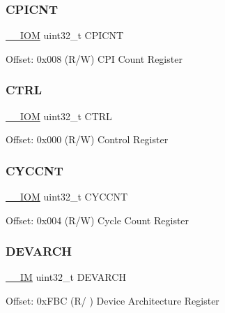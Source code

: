 \subsubsection{\texorpdfstring{C\+P\+I\+C\+NT}{CPICNT}}
{\footnotesize\ttfamily \mbox{\hyperlink{core__cm4_8h_ab6caba5853a60a17e8e04499b52bf691}{\+\_\+\+\_\+\+I\+OM}} uint32\+\_\+t C\+P\+I\+C\+NT}

Offset\+: 0x008 (R/W) C\+PI Count Register \mbox{\label{struct_d_w_t___type_ac81efc171e9852a36caeb47122bfec5b}} 
\subsubsection{\texorpdfstring{C\+T\+RL}{CTRL}}
{\footnotesize\ttfamily \mbox{\hyperlink{core__cm4_8h_ab6caba5853a60a17e8e04499b52bf691}{\+\_\+\+\_\+\+I\+OM}} uint32\+\_\+t C\+T\+RL}

Offset\+: 0x000 (R/W) Control Register \mbox{\label{struct_d_w_t___type_a14822f5ad3426799332ac537d9293f3c}} 
\subsubsection{\texorpdfstring{C\+Y\+C\+C\+NT}{CYCCNT}}
{\footnotesize\ttfamily \mbox{\hyperlink{core__cm4_8h_ab6caba5853a60a17e8e04499b52bf691}{\+\_\+\+\_\+\+I\+OM}} uint32\+\_\+t C\+Y\+C\+C\+NT}

Offset\+: 0x004 (R/W) Cycle Count Register \mbox{\label{struct_d_w_t___type_ae370aa5dc47fe03310e1d847333030e7}} 
\subsubsection{\texorpdfstring{D\+E\+V\+A\+R\+CH}{DEVARCH}}
{\footnotesize\ttfamily \mbox{\hyperlink{core__cm4_8h_a4cc1649793116d7c2d8afce7a4ffce43}{\+\_\+\+\_\+\+IM}} uint32\+\_\+t D\+E\+V\+A\+R\+CH}

Offset\+: 0x\+F\+BC (R/ ) Device Architecture Register \mbox{\label{struct_d_w_t___type_afe0bbc124e53ad450abc72bfb56bd74f}} 
